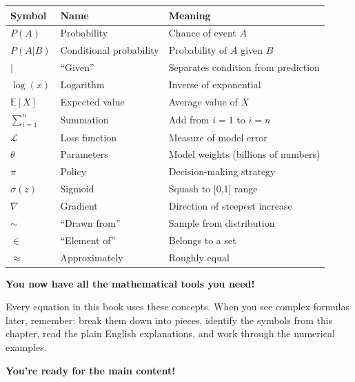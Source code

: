 \begin{chapterenv}
\begin{center}
\begin{tabular}{p{}p{}p{}}
\toprule
\textbf{Symbol} & \textbf{Name} & \textbf{Meaning} \\
\midrule
$P(A)$ & Probability & Chance of event $A$ \\
$P(A | B)$ & Conditional probability & Probability of $A$ given $B$ \\
$|$ & ``Given'' & Separates condition from prediction \\
$\log(x)$ & Logarithm & Inverse of exponential \\
$\mathbb{E}[X]$ & Expected value & Average value of $X$ \\
$\sum_{i=1}^{n}$ & Summation & Add from $i=1$ to $i=n$ \\
$\mathcal{L}$ & Loss function & Measure of model error \\
$\theta$ & Parameters & Model weights (billions of numbers) \\
$\pi$ & Policy & Decision-making strategy \\
$\sigma(z)$ & Sigmoid & Squash to [0,1] range \\
$\nabla$ & Gradient & Direction of steepest increase \\
$\sim$ & ``Drawn from'' & Sample from distribution \\
$\in$ & ``Element of'' & Belongs to a set \\
$\approx$ & Approximately & Roughly equal \\
\bottomrule
\end{tabular}
\end{center}

\begin{infobox}
\textbf{You now have all the mathematical tools you need!}

Every equation in this book uses these concepts. When you see complex formulas later, remember: break them down into pieces, identify the symbols from this chapter, read the plain English explanations, and work through the numerical examples.

\textbf{You're ready for the main content!}
\end{infobox}

\end{chapterenv}